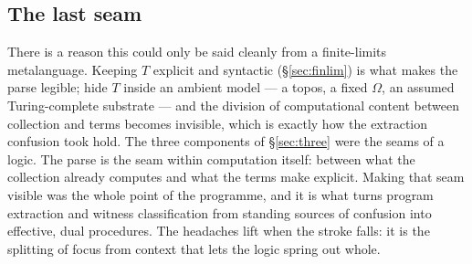 \documentclass[11pt]{article}
\theoremstyle{definition}
\theoremstyle{plain}
\newcommand{\T}{T}
\begin{document}
\subsection{The last seam}

There is a reason this could only be said cleanly from a finite-limits
metalanguage. Keeping $\T$ explicit and syntactic (\S\ref{sec:finlim}) is what
makes the parse legible; hide $\T$ inside an ambient model --- a topos, a fixed
$\Omega$, an assumed Turing-complete substrate --- and the division of
computational content between collection and terms becomes invisible, which is
exactly how the extraction confusion took hold. The three components of
\S\ref{sec:three} were the seams of a logic. The parse is the seam within
computation itself: between what the collection already computes and what the
terms make explicit. Making that seam visible was the whole point of the
programme, and it is what turns program extraction and witness classification
from standing sources of confusion into effective, dual procedures. The
headaches lift when the stroke falls: it is the splitting of focus from
context that lets the logic spring out whole.
\end{document}

